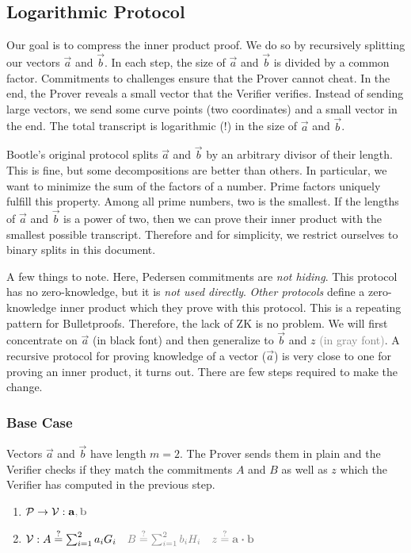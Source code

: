 \subsection{Logarithmic Protocol}

Our goal is to compress the inner product proof.
We do so by recursively splitting our vectors $\vec{a}$ and $\vec{b}$.
In each step, the size of $\vec{a}$ and $\vec{b}$ is divided by a common factor.
Commitments to challenges ensure that the Prover cannot cheat.
In the end, the Prover reveals a small vector that the Verifier verifies.
%
Instead of sending large vectors,
we send some curve points (two coordinates) and a small vector in the end.
The total transcript is logarithmic (!) in the size of $\vec{a}$ and $\vec{b}$.

Bootle's original protocol splits $\vec{a}$ and $\vec{b}$ by an arbitrary divisor of their length.
This is fine, but some decompositions are better than others.
In particular, we want to minimize the sum of the factors of a number.
Prime factors uniquely fulfill this property.
Among all prime numbers, two is the smallest.
If the lengths of $\vec{a}$ and $\vec{b}$ is a power of two,
then we can prove their inner product with the smallest possible transcript.
Therefore and for simplicity,
we restrict ourselves to binary splits in this document.

A few things to note.
%
Here, Pedersen commitments are \emph{not hiding}.
This protocol has no zero-knowledge, but it is \emph{not used directly}.
\emph{Other protocols} define a zero-knowledge inner product which they prove with this protocol.
This is a repeating pattern for Bulletproofs.
Therefore, the lack of ZK is no problem.
%
We will first concentrate on $\vec{a}$ (in black font) and then generalize to $\vec{b}$ and $z$ \textcolor{gray}{(in gray font)}.
A recursive protocol for proving knowledge of a vector ($\vec{a}$) is very close to one for proving an inner product, it turns out.
There are few steps required to make the change.

\subsubsection{Base Case}

Vectors $\vec{a}$ and $\vec{b}$ have length $m = 2$.
The Prover sends them in plain and 
the Verifier checks if they match the commitments $A$ and $B$ as well as $z$
which the Verifier has computed in the previous step.

\begin{enumerate}
    \item $\prover \to \verifier: \vec{a}{\color{gray}, \vec{b}}$
    \item \hfill $\verifier:
        A \overset{?}{=} \sum^{2}_{i = 1} a_iG_i \quad
        {\color{gray} B \overset{?}{=} \sum^{2}_{i = 1} b_iH_i \quad
        z \overset{?}{=} \vec{a} \dotprod \vec{b}}$
\end{enumerate}

